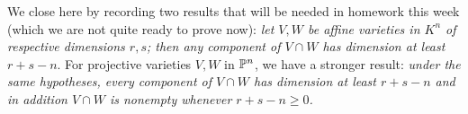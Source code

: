 \documentclass[10pt]{article}
\begin{document}
We close here by recording two results that will be needed in homework
this week (which we are not quite ready to prove now): {\sl let $V,W$ be
  affine varieties in $K^n$ of respective dimensions $r,s$; then any
  component of $V\cap W$ has dimension at least $r+s-n$}. For projective
varieties $V,W$ in $\Bbb P^n$, we have a stronger result: {\sl under the
  same hypotheses, every component of $V\cap W$ has dimension at least
  $r+s-n$ and in addition $V\cap W$ is nonempty whenever $r+s-n\ge0$.}
\end{document}
